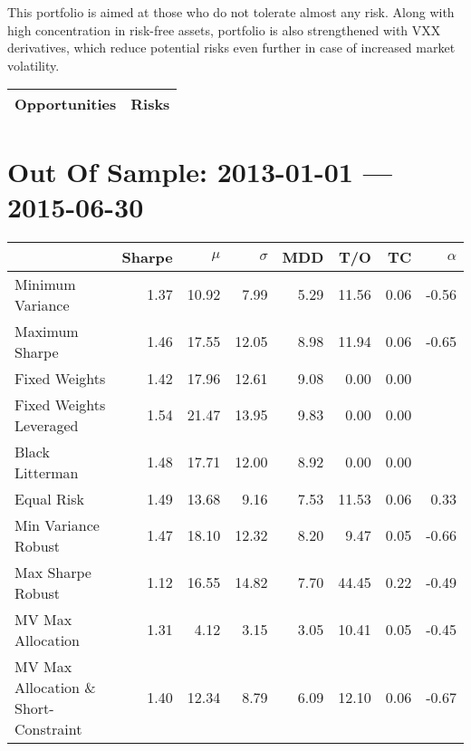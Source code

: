 \documentclass{scrreprt}
\begin{document}
This portfolio is aimed at those who do not tolerate almost any risk. Along with high concentration in risk-free assets, portfolio is also strengthened with VXX derivatives, which reduce potential risks even further in case of increased market volatility.

\begin{table}[H]
\begin{tabularx}{\textwidth}{XX}
  \toprule
  \textbf{\textsf{Opportunities}} & \textbf{\textsf{Risks}} \\
  \midrule
  \bottomrule
\end{tabularx}
\end{table}

\chapter*{Out Of Sample: 2013-01-01 --- 2015-06-30}
\begin{table}[ht]
\centering
\begin{tabular}{lrrrrrrr}
\toprule
                      & Sharpe & $\mu$ &$\sigma$& MDD & T/O & TC & $\alpha$ \\ 
\midrule
Minimum Variance & 1.37 & 10.92 & 7.99 & 5.29 & 11.56 & 0.06 & -0.56 \\ 
  Maximum Sharpe & 1.46 & 17.55 & 12.05 & 8.98 & 11.94 & 0.06 & -0.65 \\ 
  Fixed Weights & 1.42 & 17.96 & 12.61 & 9.08 & 0.00 & 0.00 &  \\ 
  Fixed Weights Leveraged & 1.54 & 21.47 & 13.95 & 9.83 & 0.00 & 0.00 &  \\ 
  Black Litterman & 1.48 & 17.71 & 12.00 & 8.92 & 0.00 & 0.00 &  \\ 
  Equal Risk & 1.49 & 13.68 & 9.16 & 7.53 & 11.53 & 0.06 & 0.33 \\ 
  Min Variance Robust & 1.47 & 18.10 & 12.32 & 8.20 & 9.47 & 0.05 & -0.66 \\ 
  Max Sharpe Robust & 1.12 & 16.55 & 14.82 & 7.70 & 44.45 & 0.22 & -0.49 \\ 
  MV Max Allocation & 1.31 & 4.12 & 3.15 & 3.05 & 10.41 & 0.05 & -0.45 \\ 
  MV Max Allocation \& Short-Constraint & 1.40 & 12.34 & 8.79 & 6.09 & 12.10 & 0.06 & -0.67 \\ 
\bottomrule
\end{tabular}
\end{table}
\end{document}
